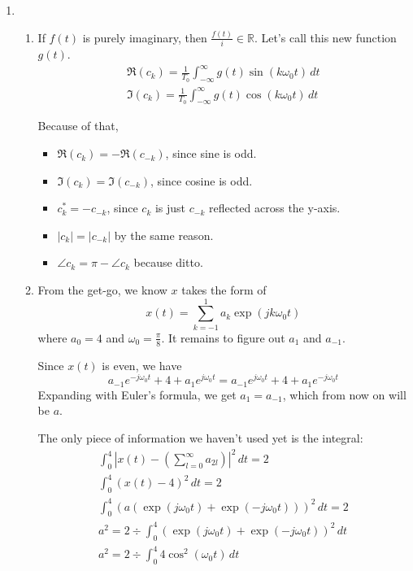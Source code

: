 \documentclass[12pt]{article}
\begin{document}
\begin{enumerate}
      \item \begin{enumerate}
                  \item If $f(t)$ is purely imaginary, then $\frac{f(t)}{i} \in \mathbb{R}$.
                        Let's call this new function $g(t)$.
                        \begin{gather*}
                              \Re(c_k)=\frac{1}{T_0} \int_{-\infty}^{\infty} g(t)\sin(k\omega_0 t)\,dt \\
                              \Im(c_k)=\frac{1}{T_0} \int_{-\infty}^{\infty} g(t)\cos(k\omega_0 t)\,dt
                        \end{gather*}

                        Because of that,
                        \begin{itemize}
                              \item $\Re(c_k)=-\Re(c_{-k})$, since sine is odd.
                              \item $\Im(c_k)=\Im(c_{-k})$, since cosine is odd.
                              \item $c_k^* = -c_{-k}$, since $c_k$ is just $c_{-k}$ reflected across the y-axis.
                              \item $|c_k|=|c_{-k}|$ by the same reason.
                              \item $\angle c_k=\pi - \angle c_k$ because ditto.
                        \end{itemize}
                  \item From the get-go, we know $x$ takes the form of
                        \[x(t)=\sum_{k=-1}^{1} a_k \exp\left(jk\omega_0t\right)\]
                        where $a_0=4$ and $\omega_0=\frac{\pi}{8}$.
                        It remains to figure out $a_1$ and $a_{-1}$.

                        Since $x(t)$ is even, we have
                        \[a_{-1}e^{-j\omega_0t}+4+a_1e^{j\omega_0t}=a_{-1}e^{j\omega_0t}+4+a_1e^{-j\omega_0t}\]
                        Expanding with Euler's formula, we get $a_1=a_{-1}$, which from now on will be $a$.

                        The only piece of information we haven't used yet is the integral:
                        \begin{gather*}
                              \int_{0}^{4} \left|x(t)-\left(\sum_{l=0}^{\infty} a_{2l}\right)\right|^2\,dt  = 2 \\
                              \int_{0}^{4} (x(t)-4)^2\,dt = 2 \\
                              \int_{0}^{4} \left(a(\exp(j\omega_0t)+\exp(-j\omega_0t))\right)^2\,dt = 2 \\
                              a^2=2 \div \int_{0}^{4} \left(\exp(j\omega_0t)+\exp(-j\omega_0t)\right)^2\,dt \\
                              a^2=2 \div \int_{0}^{4} 4\cos^2(\omega_0 t)\,dt
                        \end{gather*}


\end{enumerate}
\end{enumerate}
\end{document}
